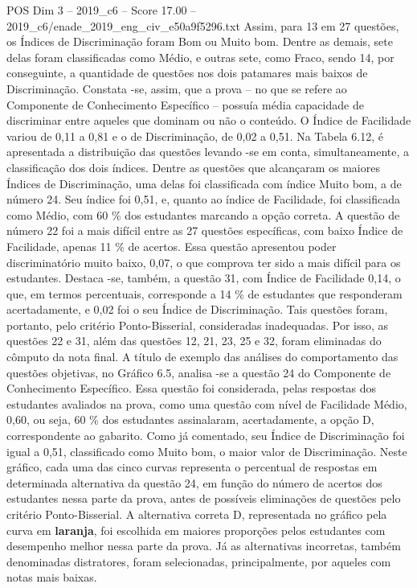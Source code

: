 \begin{textsample}{POS Dim 3 – 2019\_c6 – Score 17.00 – 2019\_c6/enade\_2019\_eng\_civ\_e50a9f5296.txt}
Assim, para 13 em 27 questões, os Índices de Discriminação foram Bom ou Muito bom.
Dentre as demais, sete delas foram classificadas como Médio, e outras sete, como Fraco, sendo 14, por conseguinte, a quantidade de questões nos dois patamares mais baixos de Discriminação.
Constata -se, assim, que a prova – no que se refere ao Componente de Conhecimento Específico – possuía média capacidade de discriminar entre aqueles que dominam ou não o conteúdo.
O Índice de Facilidade variou de 0,11 a 0,81 e o de Discriminação, de 0,02 a 0,51.
Na Tabela 6.12, é apresentada a distribuição das questões levando -se em conta, simultaneamente, a classificação dos dois índices.
Dentre as questões que alcançaram os maiores Índices de Discriminação, uma delas foi classificada com índice Muito bom, a de número 24.
Seu índice foi 0,51, e, quanto ao índice de Facilidade, foi classificada como Médio, com 60 \% dos estudantes marcando a opção correta.
A questão de número 22 foi a mais difícil entre as 27 questões específicas, com baixo Índice de Facilidade, apenas 11 \% de acertos.
Essa questão apresentou poder discriminatório muito baixo, 0,07, o que comprova ter sido a mais difícil para os estudantes.
Destaca -se, também, a questão 31, com Índice de Facilidade 0,14, o que, em termos percentuais, corresponde a 14 \% de estudantes que responderam acertadamente, e 0,02 foi o seu Índice de Discriminação.
Tais questões foram, portanto, pelo critério Ponto-Bisserial, consideradas inadequadas.
Por isso, as questões 22 e 31, além das questões 12, 21, 23, 25 e 32, foram eliminadas do cômputo da nota final.
A título de exemplo das análises do comportamento das questões objetivas, no Gráfico 6.5, analisa -se a questão 24 do Componente de Conhecimento Específico.
Essa questão foi considerada, pelas respostas dos estudantes avaliados na prova, como uma questão com nível de Facilidade Médio, 0,60, ou seja, 60 \% dos estudantes assinalaram, acertadamente, a opção D, correspondente ao gabarito.
Como já comentado, seu Índice de Discriminação foi igual a 0,51, classificado como Muito bom, o maior valor de Discriminação.
Neste gráfico, cada uma das cinco curvas representa o percentual de respostas em determinada alternativa da questão 24, em função do número de acertos dos estudantes nessa parte da prova, antes de possíveis eliminações de questões pelo critério Ponto-Bisserial.
A alternativa correta D, representada no gráfico pela curva em \textbf{laranja}, foi escolhida em maiores proporções pelos estudantes com desempenho melhor nessa parte da prova.
Já as alternativas incorretas, também denominadas distratores, foram selecionadas, principalmente, por aqueles com notas mais baixas.

\end{textsample}
